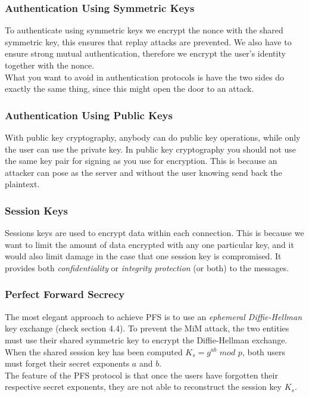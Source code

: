 \documentclass{article}
\begin{document}
\subsubsection{Authentication Using Symmetric Keys}
To authenticate using symmetric keys we encrypt the nonce with the shared symmetric key, this ensures that  replay attacks are prevented. We also have to ensure strong mutual authentication, therefore we encrypt the user's identity together with the nonce.\\
What you want to avoid in authentication protocols is have the two sides do exactly the same thing, since this might open the door to an attack.

\subsubsection{Authentication Using Public Keys}
With public key cryptography, anybody can do public key operations, while only the user can use the private key. In public key cryptography you should not use the same key pair for signing as you use for encryption. This is because an attacker can pose as the server and without the user knowing send back the plaintext.

\subsubsection{Session Keys}
Sessions keys are used to encrypt data within each connection. This is because we want to limit the amount of data encrypted with any one particular key, and it would also limit damage in the case that one session key is compromised. It provides both \textit{confidentiality} or \textit{integrity protection} (or both) to the messages.

\subsubsection{Perfect Forward Secrecy}
The most elegant approach to achieve PFS is to use an \textit{ephemeral Diffie-Hellman} key exchange (check section 4.4). To prevent the MiM attack, the two entities must use their shared symmetric key to encrypt the Diffie-Hellman exchange. When the shared session key has been computed $K_s = g^{ab}$ $mod$ $p$, both users must forget their secret exponents $a$ and $b$.\\
The feature of the PFS protocol is that once the users have forgotten their respective secret exponents, they are not able to reconstruct the session key $K_s$.
\end{document}
